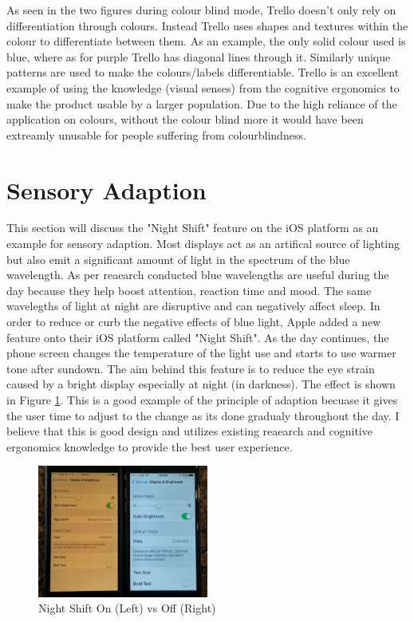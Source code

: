 \documentclass[12pt]{article}
\begin{document}
	As seen in the two figures during colour blind mode, Trello doesn't only rely on differentiation through colours. Instead Trello uses shapes and textures within the colour to differentiate between them. As an example, the only solid colour used is blue, where as for purple Trello has diagonal lines through it. Similarly unique patterns are used to make the colours/labels differentiable. Trello is an excellent example of using the knowledge (visual senses) from the cognitive ergonomics to make the product usable by a larger population. Due to the high reliance of the application on colours, without the colour blind more it would have been extreamly unusable for people suffering from colourblindness.
	
	\section{Sensory Adaption}
	This section will discuss the "Night Shift" feature on the iOS platform as an example for sensory adaption. Most displays act as an artifical source of lighting but also emit a significant amount of light in the spectrum of the blue wavelength. As per reaearch conducted blue wavelengths are useful during the day because they help boost attention, reaction time and mood. The same wavelegths of light at night are disruptive and can negatively affect sleep. In order to reduce or curb the negative effects of blue light, Apple added a new feature onto their iOS platform called "Night Shift". As the day continues, the phone screen changes the temperature of the light use and starts to use warmer tone after sundown. The aim behind this feature is to reduce the eye strain caused by a bright display especially at night (in darkness). The effect is shown in Figure \ref{nightshift}. This is a good example of the principle of adaption becuase it gives the user time to adjust to the change as its done gradualy throughout the day. I believe that this is good design and utilizes existing reaearch and cognitive ergonomics knowledge to provide the best user experience.
	
	\begin{figure}[!ht]
		\centering
		\includegraphics[width=0.5\textwidth]{nightshift}
		\caption{Night Shift On (Left) vs Off (Right)}
		\label{nightshift}
	\end{figure}
	
\end{document}
